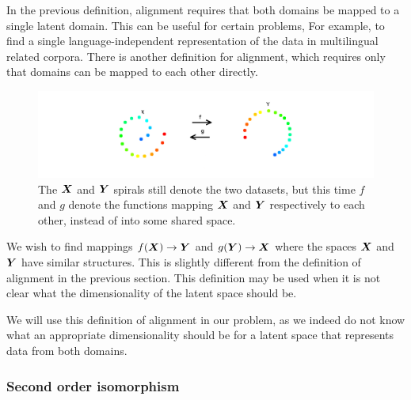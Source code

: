 In the previous definition, alignment requires that both domains be mapped to a single latent domain. This can be useful for certain problems, For example, to find a single language-independent representation of the data in multilingual related corpora. There is another definition for alignment, which requires only that domains can be mapped to each other directly. 

\begin{figure}[H]
\label{fig:alignment2}
    \centering
    \includegraphics[width=\textwidth]{images/review/alignment2.png}
    \caption{
        The $\boldsymbol{X}$ and $\boldsymbol{Y}$ spirals still denote the two datasets, but this time $f$ and $g$ denote the functions mapping $\boldsymbol{X}$ and $\boldsymbol{Y}$ respectively to each other, instead of into some shared space.
    }
\end{figure}

We wish to find mappings $f(\boldsymbol{X}) \rightarrow \boldsymbol{Y}$ and $g(\boldsymbol{Y}) \rightarrow \boldsymbol{X}$ where the spaces $\boldsymbol{X}$ and $\boldsymbol{Y}$  have similar structures. This is slightly different from the definition of alignment in the previous section. This definition may be used when it is not clear what the dimensionality of the latent space should be. 

We will use this definition of alignment in our problem, as we indeed do not know what an appropriate dimensionality should be for a latent space that represents data from both domains. 

\subsubsection{Second order isomorphism}


